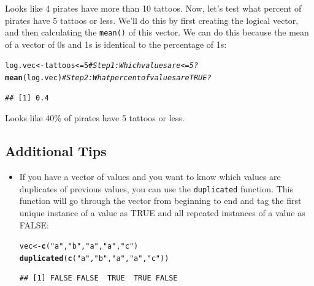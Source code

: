 \documentclass{tufte-book}\usepackage[]{graphicx}\usepackage[]{color}
\makeatletter
\newcommand{\hlnum}[1]{\textcolor[rgb]{0.686,0.059,0.569}{#1}}%
\newcommand{\hlstr}[1]{\textcolor[rgb]{0.192,0.494,0.8}{#1}}%
\newcommand{\hlcom}[1]{\textcolor[rgb]{0.678,0.584,0.686}{\textit{#1}}}%
\newcommand{\hlopt}[1]{\textcolor[rgb]{0,0,0}{#1}}%
\newcommand{\hlstd}[1]{\textcolor[rgb]{0.345,0.345,0.345}{#1}}%
\newcommand{\hlkwb}[1]{\textcolor[rgb]{0.69,0.353,0.396}{#1}}%
\newcommand{\hlkwd}[1]{\textcolor[rgb]{0.737,0.353,0.396}{\textbf{#1}}}%
\newenvironment{kframe}{%
 \def\at@end@of@kframe{}%
 \ifinner\ifhmode%
  \def\at@end@of@kframe{\end{minipage}}%
  \begin{minipage}{\columnwidth}%
 \fi\fi%
 \def\FrameCommand##1{\hskip\@totalleftmargin \hskip-\fboxsep
 \colorbox{shadecolor}{##1}\hskip-\fboxsep
     \hskip-\linewidth \hskip-\@totalleftmargin \hskip\columnwidth}%
 \MakeFramed {\advance\hsize-\width
   \@totalleftmargin\z@ \linewidth\hsize
   \@setminipage}}%
 {\par\unskip\endMakeFramed%
 \at@end@of@kframe}
\newenvironment{knitrout}{}{} %
\makeatother
\begin{document}
\begin{footnotesize}
Looks like 4 pirates have more than 10 tattoos. Now, let's test what percent of pirates have 5 tattoos or less. We'll do this by first creating the logical vector, and then calculating the \texttt{mean()} of this vector. We can do this because the mean of a vector of 0s and 1s is identical to the percentage of 1s:

\begin{knitrout}
\color{fgcolor}\begin{kframe}
\begin{alltt}
\hlstd{log.vec} \hlkwb{<-} \hlstd{tattoos} \hlopt{<=} \hlnum{5} \hlcom{# Step 1: Which values are <= 5?}
\hlkwd{mean}\hlstd{(log.vec)} \hlcom{# Step 2: What percent of values are TRUE?}
\end{alltt}
\begin{verbatim}
## [1] 0.4
\end{verbatim}
\end{kframe}
\end{knitrout}

Looks like 40\% of pirates have 5 tattoos or less.




\subsection{Additional Tips}

\begin{itemize}

  \item If you have a vector of values and you want to know which values are duplicates of previous values, you can use the \texttt{duplicated} function. This function will go through the vector from beginning to end and tag the first unique instance of a value as TRUE and all repeated instances of a value as FALSE:
  
\begin{knitrout}
\color{fgcolor}\begin{kframe}
\begin{alltt}
\hlstd{vec} \hlkwb{<-} \hlkwd{c}\hlstd{(}\hlstr{"a"}\hlstd{,} \hlstr{"b"}\hlstd{,} \hlstr{"a"}\hlstd{,} \hlstr{"a"}\hlstd{,} \hlstr{"c"}\hlstd{)}
\hlkwd{duplicated}\hlstd{(}\hlkwd{c}\hlstd{(}\hlstr{"a"}\hlstd{,} \hlstr{"b"}\hlstd{,} \hlstr{"a"}\hlstd{,} \hlstr{"a"}\hlstd{,} \hlstr{"c"}\hlstd{))}
\end{alltt}
\begin{verbatim}
## [1] FALSE FALSE  TRUE  TRUE FALSE
\end{verbatim}
\end{kframe}
\end{knitrout}


\end{itemize}
\end{footnotesize}
\end{document}
